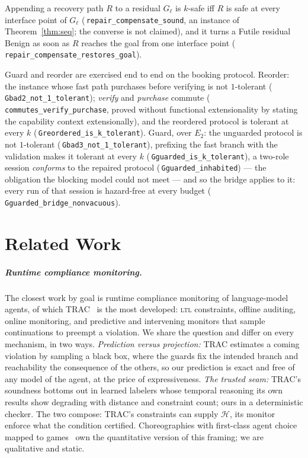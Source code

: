 \documentclass[a4paper,UKenglish,cleveref,autoref,thm-restate,anonymous]{lipics-v2021}
\newcommand{\Haz}{\mathcal H}
\newcommand{\Ben}{\textsf{Benign}}
\newcommand{\Fut}{\textsf{Futile}}
\newcommand{\coqok}[1]{\textcolor{okgreen}{\ding{51}}\,\texttt{\small #1}}
\begin{document}
\begin{theorem}[Compensate]\label{thm:compensate}
Appending a recovery path $R$ to a residual $G_\ell$ is $k$-safe iff $R$ is
safe at every interface point of $G_\ell$ (\coqok{repair\_compensate\_sound},
an instance of Theorem~\ref{thm:seq}; the converse is not claimed), and it
turns a \Fut{} residual \Ben{} as soon as $R$ reaches the goal from one
interface point
(\coqok{repair\_compensate\_restores\_goal}).
\end{theorem}

Guard and reorder are exercised end to end on the booking protocol. Reorder: the
instance whose fast path purchases before verifying is not $1$-tolerant
(\coqok{Gbad2\_not\_1\_tolerant}); \emph{verify} and \emph{purchase} commute
(\coqok{commutes\_verify\_purchase}, proved without functional extensionality
by stating the capability context extensionally), and the reordered protocol
is tolerant at every $k$ (\coqok{Greordered\_is\_k\_tolerant}). Guard, over
$E_2$: the unguarded protocol is not $1$-tolerant
(\coqok{Gbad3\_not\_1\_tolerant}), prefixing the fast branch with the
validation makes it tolerant at every $k$
(\coqok{Gguarded\_is\_k\_tolerant}), a two-role session \emph{conforms} to the
repaired protocol (\coqok{Gguarded\_inhabited}) --- the obligation the
blocking model could not meet --- and so the bridge applies to it: every run
of that session is hazard-free at every budget
(\coqok{Gguarded\_bridge\_nonvacuous}).

\section{Related Work}\label{sec:related}

\subparagraph*{Runtime compliance monitoring.} The closest work by goal is
runtime compliance monitoring of language-model agents, of which
TRAC~\cite{trac-facct26} is the most developed: \textsc{ltl} constraints,
offline auditing, online monitoring, and predictive and intervening monitors
that sample continuations to preempt a violation. We share the question and differ on every
mechanism, in two ways. \emph{Prediction versus projection:} TRAC estimates a
coming violation by sampling a black box, where the guards fix the intended
branch and reachability the consequence of the others, so our prediction is
exact and free of any model of the agent, at the price of expressiveness.
\emph{The trusted seam:} TRAC's soundness bottoms out in learned labelers whose
temporal reasoning its own results show degrading with distance and constraint
count; ours in a deterministic checker. The two compose: TRAC's constraints can
supply $\Haz$, its monitor enforce what the condition certified. Choreographies
with first-class agent choice mapped to games~\cite{pact} own the quantitative
version of this framing; we are qualitative and static.
\end{document}
